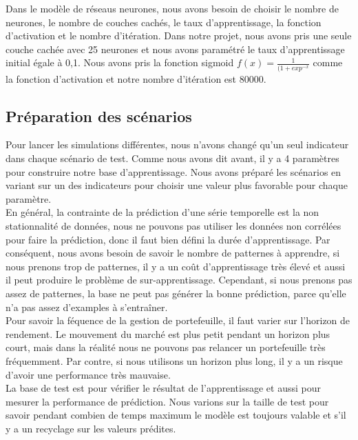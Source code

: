 Dans le modèle de réseaus neurones, nous avons besoin de choisir le nombre de neurones, le nombre de couches cachés, le taux d'apprentissage, la fonction d’activation et le nombre d'itération. Dans notre projet, nous avons pris une seule couche cachée avec 25 neurones et nous avons paramétré le taux d'apprentissage initial égale à 0,1. Nous avons pris la fonction sigmoid $ f(x) = \frac{1}{(1 + exp^{-x}} $ comme la fonction d'activation et notre nombre d'itération est 80000.

\subsection{Préparation des scénarios}

Pour lancer les simulations différentes, nous n'avons changé qu'un seul indicateur dans chaque scénario de test. Comme nous avons dit avant, il y a 4 paramètres pour construire notre base d'apprentissage. Nous avons préparé les scénarios en variant sur un des indicateurs pour choisir une valeur plus favorable pour chaque paramètre. \\

En général, la contrainte de la prédiction d'une série temporelle est la non stationnalité de données, nous ne pouvons pas utiliser les données non corrélées pour faire la prédiction, donc il faut bien défini la durée d'apprentissage. Par conséquent, nous avons besoin de savoir le nombre de patternes à apprendre, si nous prenons trop de patternes, il y a un coût d'apprentissage très élevé et aussi il peut produire le problème de sur-apprentissage. Cependant, si nous prenons pas assez de patternes, la base ne peut pas générer la bonne prédiction, parce qu'elle n'a pas assez d'examples à s'entraîner. \\

Pour savoir la féquence de la gestion de portefeuille, il faut varier sur l'horizon de rendement. Le mouvement du marché est plus petit pendant un horizon plus court, mais dans la réalité nous ne pouvons pas relancer un portefeuille très fréquemment. Par contre, si nous utilisons un horizon plus long, il y a un risque d'avoir une performance très mauvaise. \\

La base de test est pour vérifier le résultat de l'apprentissage et aussi pour mesurer la performance de prédiction. Nous varions sur la taille de test pour savoir pendant combien de temps maximum le modèle est toujours valable et s'il y a un recyclage sur les valeurs prédites. \\

